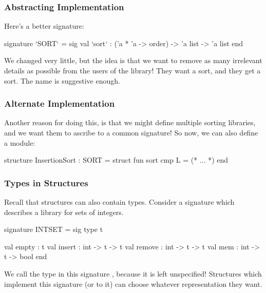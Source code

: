 \documentclass[aspectratio=169]{beamer}
\begin{document}
\begin{frame}[fragile]
  \frametitle{Abstracting Implementation}

  Here's a better signature:
  
  \begin{codeblock}
    signature `SORT` =
      sig
        val `sort` : ('a * 'a -> order) -> 'a list -> 'a list
      end
  \end{codeblock}

  \vspace{\fill}

  We changed very little, but the idea is that we want to remove as many irrelevant
  details as possible from the users of the library! They want a sort, and they
  get a sort. The name is suggestive enough.
\end{frame}

\begin{frame}[fragile]
  \frametitle{Alternate Implementation}


  Another reason for doing this, is that we might define multiple sorting libraries,
  and we want them to ascribe to a common signature! So now, we can also define a 
   module:

  \vspace{\fill}

  \begin{codeblock}
    structure InsertionSort : SORT =
      struct 
        fun sort cmp L = (* ... *)
      end
  \end{codeblock}
\end{frame}



\begin{frame}[fragile]
  \frametitle{Types in Structures}

  Recall that structures can also contain types. Consider a signature which 
  describes a library for sets of integers. 

  \vspace{\fill}

  \begin{codeblock}
    signature INTSET =
      sig
        type t 

        val empty : t 
        val insert : int -> t -> t
        val remove : int -> t -> t
        val mem : int -> t -> bool
      end
  \end{codeblock}

  \vspace{\fill}

  We call the type  in this signature , because it
  is left unspecified! Structures which implement this signature (or 
  to it) can choose whatever representation they want.
\end{frame}
\end{document}
